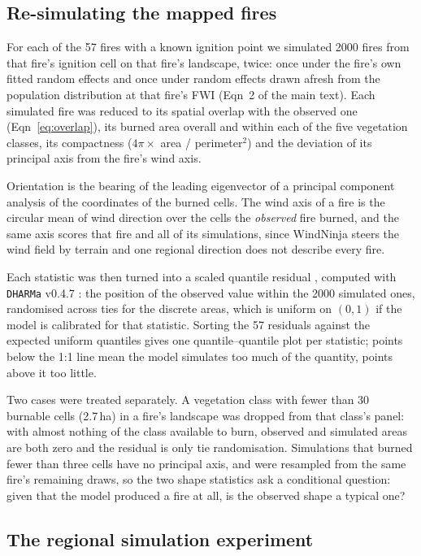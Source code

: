 \documentclass[11pt,a4paper]{article}
\begin{document}
\subsection{Re-simulating the mapped fires}

For each of the 57 fires with a known ignition point we simulated 2000 fires from that
fire's ignition cell on that fire's landscape, twice: once under the fire's own fitted
random effects and once under random effects drawn afresh from the population distribution
at that fire's FWI (Eqn~2 of the main text). Each simulated fire was reduced to its spatial
overlap with the observed one (Eqn~\ref{eq:overlap}), its burned area overall and within
each of the five vegetation classes, its compactness ($4\pi \times$ area / perimeter$^2$)
and the deviation of its principal axis from the fire's wind axis.

Orientation is the bearing of the leading eigenvector of a principal component analysis of
the coordinates of the burned cells. The wind axis of a fire is the circular mean of wind
direction over the cells the \emph{observed} fire burned, and the same axis scores that
fire and all of its simulations, since WindNinja steers the wind field by terrain and one
regional direction does not describe every fire.

Each statistic was then turned into a scaled quantile residual
\citep{dunn1996randomized}, computed with \texttt{DHARMa} v0.4.7 \citep{DHARMa}: the
position of the observed value within the 2000 simulated ones, randomised across ties for
the discrete areas, which is uniform on $(0, 1)$ if the model is calibrated for that
statistic. Sorting the 57 residuals against the expected uniform quantiles gives one
quantile--quantile plot per statistic; points below the 1:1 line mean the model simulates
too much of the quantity, points above it too little.

Two cases were treated separately. A vegetation class with fewer than 30 burnable cells
(2.7\,ha) in a fire's landscape was dropped from that class's panel: with almost nothing of
the class available to burn, observed and simulated areas are both zero and the residual is
only tie randomisation. Simulations that burned fewer than three cells have no principal
axis, and were resampled from the same fire's remaining draws, so the two shape statistics
ask a conditional question: given that the model produced a fire at all, is the observed
shape a typical one?

\subsection{The regional simulation experiment}
\end{document}
